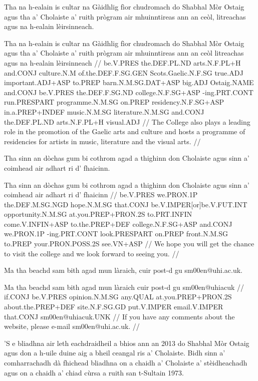 \documentclass[a4paper,10pt]{article}
\begin{document}
\ex
\begingl
\glpre Tha na h-ealain is cultar na Gàidhlig fìor chudromach do Shabhal Mòr Ostaig agus tha a' Cholaiste a' ruith prògram air mhuinntireas ann an ceòl, litreachas agus na h-ealain lèirsinneach. 

\vspace{4mm}
\gla Tha na h-ealain is cultar na Gàidhlig fìor chudromach do Shabhal Mòr Ostaig agus tha a' Cholaiste a' ruith prògram air mhuinntireas {ann an} ceòl litreachas agus na h-ealain lèirsinneach  //
\glb be.V.PRES the.DEF.PL.ND arts.N.F.PL+H and.CONJ culture.N.M of.the.DEF.F.SG.GEN Scots.Gaelic.N.F.SG true.ADJ important.ADJ+ASP to.PREP barn.N.M.SG.DAT+ASP big.ADJ Ostaig.NAME and.CONJ be.V.PRES the.DEF.F.SG.ND college.N.F.SG+ASP -ing.PRT.CONT run.PRESPART programme.N.M.SG on.PREP residency.N.F.SG+ASP in.a.PREP+INDEF music.N.M.SG literature.N.M.SG and.CONJ the.DEF.PL.ND arts.N.F.PL+H visual.ADJ  //
\glft The College also plays a leading role in the promotion of the Gaelic arts and culture and hosts a programme of residencies for artists in music, literature and the visual arts. //
\endgl
\xe

\ex
\begingl
\glpre Tha sinn an dòchas gum bi cothrom agad a thighinn don Cholaiste agus sinn a' coimhead air adhart ri d' fhaicinn. 

\vspace{4mm}
\gla Tha sinn an dòchas gum bi cothrom agad a thighinn don Cholaiste agus sinn a' coimhead air adhart ri d' fhaicinn  //
\glb be.V.PRES we.PRON.1P the.DEF.M.SG.NGD hope.N.M.SG that.CONJ be.V.IMPER[or]be.V.FUT.INT opportunity.N.M.SG at.you.PREP+PRON.2S to.PRT.INFIN come.V.INFIN+ASP to.the.PREP+DEF college.N.F.SG+ASP and.CONJ we.PRON.1P -ing.PRT.CONT look.PRESPART on.PREP front.N.M.SG to.PREP your.PRON.POSS.2S see.VN+ASP  //
\glft We hope you will get the chance to visit the college and we look forward to seeing you. //
\endgl
\xe

\ex
\begingl
\glpre Ma tha beachd sam bith agad mun làraich, cuir post-d gu sm00en@uhi.ac.uk. 

\vspace{4mm}
\gla Ma tha beachd {sam bith} agad mun làraich cuir post-d gu sm00en@uhiacuk  //
\glb if.CONJ be.V.PRES opinion.N.M.SG any.QUAL at.you.PREP+PRON.2S about.the.PREP+DEF site.N.F.SG.GD put.V.IMPER email.V.IMPER that.CONJ sm00en@uhiacuk.UNK  //
\glft If you have any comments about the website, please e-mail sm00en@uhi.ac.uk. //
\endgl
\xe

\ex
\begingl
\glpre 'S e bliadhna air leth eachdraidheil a bhios ann an 2013 do Shabhal Mòr Ostaig agus don a h-uile duine aig a bheil ceangal ris a' Cholaiste. Bidh sinn a' comharrachadh dà fhichead bliadhna on a chaidh a' Cholaiste a' stèidheachadh agus on a chaidh a' chiad cùrsa a ruith san t-Sultain 1973. 
\end{document}

